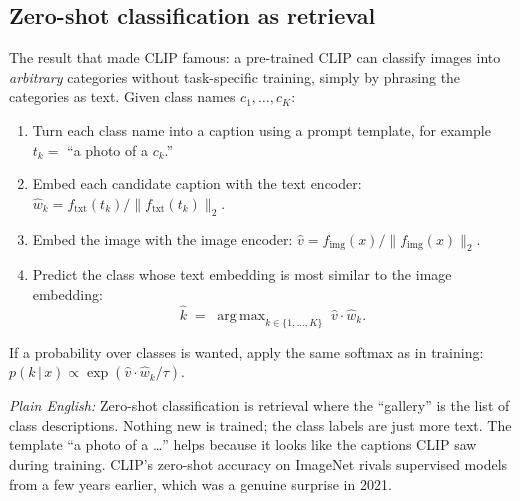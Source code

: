 \documentclass[11pt]{article}
\newcommand{\given}{\,\vert\,}
\DeclareMathOperator*{\argmax}{arg\,max}
\theoremstyle{remark}
\newcommand{\fimg}{f_{\text{img}}}
\newcommand{\ftxt}{f_{\text{txt}}}
\newcommand{\plain}[1]{\medskip\noindent\textit{Plain English:} #1\medskip}
\begin{document}
\subsection{Zero-shot classification as retrieval}
The result that made CLIP famous: a pre-trained CLIP can classify images into \emph{arbitrary} categories without task-specific training, simply by phrasing the categories as text. Given class names $c_1, \dots, c_K$:
\begin{enumerate}[leftmargin=1.6em]
  \item Turn each class name into a caption using a prompt template, for example $t_k = $ ``a photo of a $c_k$.''
  \item Embed each candidate caption with the text encoder: $\hat{w}_k = \ftxt(t_k)/\|\ftxt(t_k)\|_2$.
  \item Embed the image with the image encoder: $\hat{v} = \fimg(x)/\|\fimg(x)\|_2$.
  \item Predict the class whose text embedding is most similar to the image embedding:
  \begin{equation}
  \hat{k} \;=\; \argmax_{k \in \{1,\dots,K\}} \; \hat{v} \cdot \hat{w}_k .
  \label{eq:zeroshot}
  \end{equation}
\end{enumerate}
If a probability over classes is wanted, apply the same softmax as in training: $p(k \given x) \propto \exp(\hat{v}\cdot\hat{w}_k/\tau)$.

\plain{Zero-shot classification is retrieval where the ``gallery'' is the list of class descriptions. Nothing new is trained; the class labels are just more text. The template ``a photo of a \ldots'' helps because it looks like the captions CLIP saw during training. CLIP's zero-shot accuracy on ImageNet rivals supervised models from a few years earlier, which was a genuine surprise in 2021.}
\end{document}

